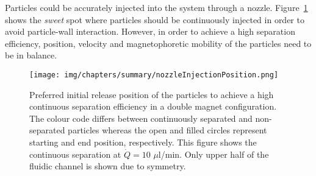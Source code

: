Particles could be accurately injected into the system through a nozzle. Figure~\ref{fig:nozzleInjection} shows the \textit{sweet} spot where particles should be continuously injected in order to avoid particle-wall interaction. However, in order to achieve a high separation efficiency, position, velocity and magnetophoretic mobility of the particles need to be in balance.

\begin{figure}[htb]
\centering
\texttt{[image: img/chapters/summary/nozzleInjectionPosition.png]}
\caption[Particle injection through a nozzle]{Preferred initial release position of the particles to achieve a high continuous separation efficiency in a double magnet configuration. The colour code differs between continuously separated and non-separated particles whereas the open and filled circles represent starting and end position, respectively. This figure shows the continuous separation at $\dot{Q}=10$ $\mu$l/min. Only upper half of the fluidic channel is shown due to symmetry.}
\label{fig:nozzleInjection}
\end{figure}
